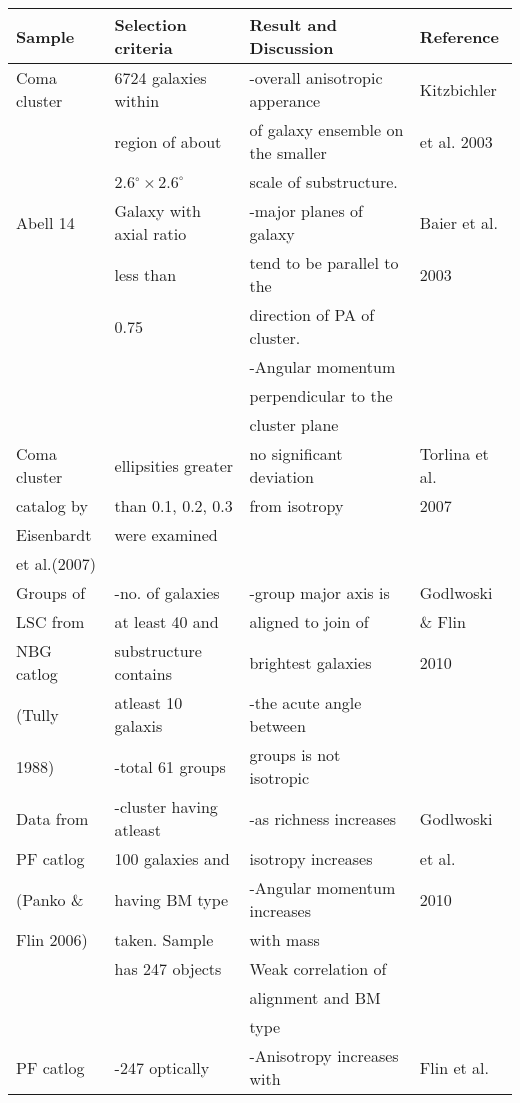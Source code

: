 \begin{center}
 \begin{tabular}[lp=7cm]{|l|l|l|l|}
\hline\hline
Sample		 		& Selection criteria 			& Result and Discussion 					& Reference\\
\hline
Coma cluster&6724 galaxies within&-overall anisotropic apperance &Kitzbichler\\
			&region of about&of galaxy ensemble on the smaller  &et al. 2003\\
			&2.6$^\circ\times2.6^\circ$&scale of substructure.&\\
			\hline
Abell 14&Galaxy with axial ratio&-major planes of galaxy&Baier et al.\\
	&less than &tend to be parallel to the&2003\\
	&0.75 &direction of PA of cluster.&\\
	& &-Angular momentum&\\
	& &perpendicular to the &\\
	&&cluster plane&\\
	\hline
Coma cluster		&ellipsities greater 	&no significant deviation 	&Torlina et al. \\
catalog by&than 0.1, 0.2, 0.3 &from isotropy &2007 \\
Eisenbardt &were examined & & \\
et al.(2007)& & & \\ 
\hline
Groups of &-no. of galaxies&-group major axis is& Godlwoski\\		
LSC from&at least 40 and&aligned to join of&\& Flin\\
NBG catlog&substructure contains&brightest galaxies&2010\\
(Tully&atleast 10 galaxis&-the acute angle between &\\
1988)&-total 61 groups&groups is not isotropic&\\
\hline
Data from &-cluster having atleast&-as richness increases&Godlwoski\\
PF catlog&100 galaxies and&isotropy increases&et al.\\
(Panko \& &having BM type&-Angular momentum increases&2010\\
Flin 2006)&taken. Sample&with mass&\\
&has 247 objects&Weak correlation of&\\
&&alignment and BM&\\
&&type&\\
\hline
PF catlog&-247 optically&-Anisotropy increases with&Flin et al.\\

\end{tabular}
\end{center}
